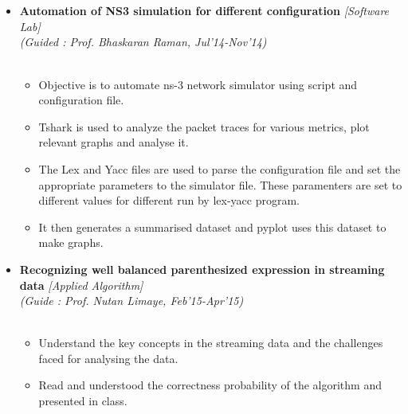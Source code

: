 \\[-0.7cm]\\
\begin{itemize}
	\item \textbf{Automation of NS3 simulation for different configuration} \hfill \emph{[Software Lab]} \\
	\emph{(Guided : Prof. Bhaskaran Raman, Jul'14-Nov'14)} \hfill \\[-1cm]\\ 
\begin{itemize}
\item Objective is to automate ns-3  network  simulator using script and configuration file.  
\item Tshark is used to analyze the packet traces for various metrics, plot relevant graphs and analyse it.
\item The Lex and Yacc files are used to parse the configuration file and set the appropriate parameters to the simulator file. These paramenters are set to different values for different run by lex-yacc program. 
\item It then generates a summarised dataset and pyplot uses this dataset to make graphs.
\end{itemize}
\item \textbf{Recognizing well balanced parenthesized expression in streaming data} \hfill \emph{[Applied Algorithm]} \\
	\emph{(Guide : Prof. Nutan Limaye, Feb'15-Apr'15)} \hfill \\[-1cm]\\ 
\begin{itemize}
\item Understand the key concepts in the streaming data and the challenges faced for analysing the data.
\item Read and understood the correctness probability of the algorithm and presented in class.
\end{itemize}
\end{itemize}
